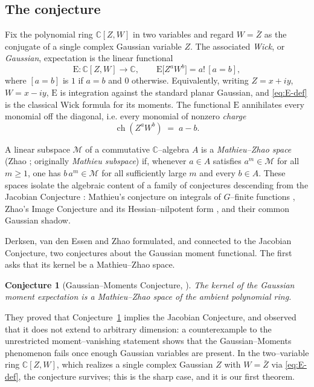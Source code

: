 \documentclass[11pt,reqno]{amsart}
\theoremstyle{plain}
\newtheorem{conjecture}[theorem]{Conjecture}
\theoremstyle{definition}
\newcommand{\C}{\mathbb{C}}
\newcommand{\E}{\mathrm{E}}
\newcommand{\ch}{\operatorname{ch}}
\begin{document}
\subsection{The conjecture}
Fix the polynomial ring $\C[Z,W]$ in two variables and regard $W=\bar Z$ as the conjugate of a single
complex Gaussian variable $Z$. The associated \emph{Wick}, or \emph{Gaussian}, expectation is the
linear functional
\begin{equation}\label{eq:E-def}
  \E\colon \C[Z,W]\longrightarrow \C,\qquad
  \E\big[Z^aW^b\big]=a!\,[a=b],
\end{equation}
where $[a=b]$ is $1$ if $a=b$ and $0$ otherwise. Equivalently, writing $Z=x+iy$, $W=x-iy$,
$\E$ is integration against the standard planar Gaussian, and \eqref{eq:E-def} is the classical Wick
formula for its moments. The functional $\E$ annihilates every monomial off the diagonal, i.e. every
monomial of nonzero \emph{charge}
\[
  \ch(Z^aW^b)\;=\;a-b .
\]

A linear subspace $\mathcal M$ of a commutative $\C$--algebra $A$ is a \emph{Mathieu--Zhao space}
(Zhao \cite{Zhao2010}; originally \emph{Mathieu subspace}) if, whenever $a\in A$ satisfies $a^m\in\mathcal M$
for all $m\ge1$, one has $b\,a^m\in\mathcal M$ for all sufficiently large $m$ and every $b\in A$. These
spaces isolate the algebraic content of a family of conjectures descending from the Jacobian
Conjecture \cite{vandenEssen2000}: Mathieu's conjecture on integrals of $G$--finite functions
\cite{Mathieu1997}, Zhao's Image Conjecture and its Hessian--nilpotent form
\cite{ZhaoImage,Zhao2007a}, and their common Gaussian shadow.

Derksen, van den Essen and Zhao \cite{DerksenEssenZhao2017} formulated, and connected to the Jacobian
Conjecture, two conjectures about the Gaussian moment functional. The first asks that its kernel be a
Mathieu--Zhao space.

\begin{conjecture}[Gaussian--Moments Conjecture, {\cite{DerksenEssenZhao2017}}]\label{conj:GMC}
The kernel of the Gaussian moment expectation is a Mathieu--Zhao space of the ambient polynomial ring.
\end{conjecture}

They proved that Conjecture~\ref{conj:GMC} implies the Jacobian Conjecture, and observed that it does
not extend to arbitrary dimension: a counterexample to the unrestricted moment--vanishing statement
shows that the Gaussian--Moments phenomenon fails once enough Gaussian variables are present. In the
two--variable ring $\C[Z,W]$, which realizes a single complex Gaussian $Z$ with $W=\bar Z$ via
\eqref{eq:E-def}, the conjecture survives; this is the sharp case, and it is our first theorem.
\end{document}

